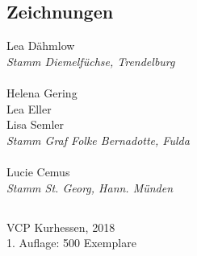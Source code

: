 \begin{centering}
\begin{multicols}{2}
\subsection*{Zeichnungen}
Lea Dähmlow \\ \textit{Stamm Diemelfüchse, Trendelburg} \\ ~\\
Helena Gering \\ Lea Eller \\ Lisa Semler \\ \textit{Stamm Graf Folke Bernadotte, Fulda} \\ ~\\
Lucie Cemus \\ \textit{Stamm St. Georg, Hann. Münden} \\

\end{multicols}

\vfill

\subsection*{}
VCP Kurhessen, 2018 \\
1. Auflage: 500 Exemplare

\end{centering}


